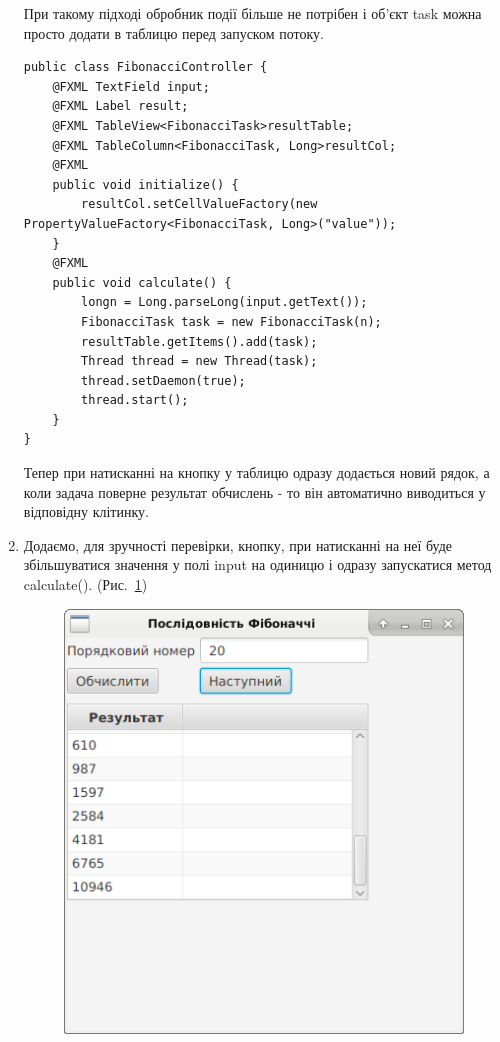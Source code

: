 \begin{enumerate}
	При такому підході обробник події більше не потрібен і об'єкт task можна просто додати в таблицю перед запуском потоку.

\begin{verbatim}
public class FibonacciController {
	@FXML TextField input;
	@FXML Label result;
	@FXML TableView<FibonacciTask>resultTable;
	@FXML TableColumn<FibonacciTask, Long>resultCol;
	@FXML
	public void initialize() {
		resultCol.setCellValueFactory(new PropertyValueFactory<FibonacciTask, Long>("value"));
	}
	@FXML
	public void calculate() {
		longn = Long.parseLong(input.getText());
		FibonacciTask task = new FibonacciTask(n);
		resultTable.getItems().add(task);
		Thread thread = new Thread(task);
		thread.setDaemon(true);
		thread.start();
	}
}
\end{verbatim}

	Тепер при натисканні на кнопку у таблицю одразу додається новий рядок, а коли задача поверне результат обчислень - то він автоматично виводиться у відповідну клітинку.

	\item Додаємо, для зручності перевірки, кнопку, при натисканні на неї буде збільшуватися значення у полі input на одиницю і одразу запускатися метод calculate(). (Рис.~\ref{fig:image4})

	\begin{figure}[h]
		\includegraphics{chapter21/images/image4.png}
		\caption{}
		\label{fig:image4}
	\end{figure}


\end{enumerate}
